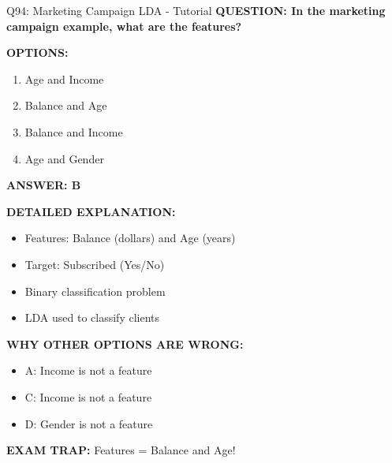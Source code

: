 \documentclass[8pt]{beamer}
\begin{document}
	\begin{frame}{Q94: Marketing Campaign LDA - Tutorial}
		\fontsize{6.5}{7.5}\selectfont
		\textbf{QUESTION: In the marketing campaign example, what are the features?}
		
		\vspace{0.1cm}
		\textbf{OPTIONS:}
		\begin{enumerate}
			\item Age and Income
			\item Balance and Age
			\item Balance and Income
			\item Age and Gender
		\end{enumerate}
		
		\vspace{0.1cm}
		\textcolor{myblue}{\textbf{ANSWER: B}}
		
		\vspace{0.1cm}
		\textbf{DETAILED EXPLANATION:}
		\begin{itemize}
			\item Features: Balance (dollars) and Age (years)
			\item Target: Subscribed (Yes/No)
			\item Binary classification problem
			\item LDA used to classify clients
		\end{itemize}
		
		\vspace{0.1cm}
		\textcolor{myred}{\textbf{WHY OTHER OPTIONS ARE WRONG:}}
		\begin{itemize}
			\item \textcolor{myred}{A:} Income is not a feature
			\item \textcolor{myred}{C:} Income is not a feature
			\item \textcolor{myred}{D:} Gender is not a feature
		\end{itemize}
		
		\textcolor{myred}{\textbf{EXAM TRAP:}} Features = \textcolor{myblue}{Balance and Age}!
	\end{frame}
	
\end{document}
